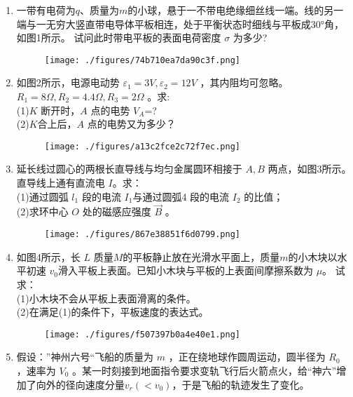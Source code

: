 
\begin{enumerate}
\item 一带有电荷为$q$、质量为$m$的小球，悬于一不带电绝缘细丝线一端。线的另一端与一无穷大竖直带电导体平板相连，处于平衡状态时细线与平板成$30$°角，如图1所示。 试问此时带电平板的表面电荷密度 $\sigma$ 为多少?
\begin{figure}[ht]
\centering
\texttt{[image: ./figures/74b710ea7da90c3f.png]}
\caption{} \label{fig_ZKYP06_1}
\end{figure}
\item 如图2所示，电源电动势  $\varepsilon_1=3V,\varepsilon_2=12V$ ，其内阻均可忽略。 $R_1=8\Omega,R_2=4.4\Omega,R_3=2\Omega$  。求:\\
(1)$K$ 断开时，$A$  点的电势  $V_A$=?\\
(2)$K$合上后，$A$  点的电势又为多少？
\begin{figure}[ht]
\centering
\texttt{[image: ./figures/a13c2fce2c72f7ec.png]}
\caption{} \label{fig_ZKYP06_2}
\end{figure}
\item 延长线过圆心的两根长直导线与均匀金属圆环相接于 $A,B $ 两点，如图3所示。直导线上通有直流电 $I$。求：\\
(1)通过圆弧 $l_1$ 段的电流 $I_1 $与通过圆弧4 段的电流 $I_2$ 的比值；\\
(2)求环中心 $O$ 处的磁感应强度 $\vec B$ 。
\begin{figure}[ht]
\centering
\texttt{[image: ./figures/867e38851f6d0799.png]}
\caption{} \label{fig_ZKYP06_3}
\end{figure}
\item 如图4所示，长 $L$ 质量$M$的平板静止放在光滑水平面上，质量$m$的小木块以水平初速 $v_0$滑入平板上表面。已知小木块与平板的上表面间摩擦系数为 $\mu $。 试求：\\
(1)小木块不会从平板上表面滑离的条件。\\
(2)在满足(1)的条件下，平板速度的表达式。
\begin{figure}[ht]
\centering
\texttt{[image: ./figures/f507397b0a4e40e1.png]}
\caption{} \label{fig_ZKYP06_4}
\end{figure}
\item 假设：”神州六号“飞船的质量为 $m$ ，正在绕地球作圆周运动，圆半径为 $R_0$ ，速率为 $V_0$ 。某一时刻接到地面指令要求变轨飞行后火箭点火，给“神六”增加了向外的径向速度分量$v_r(<v_0)$，于是飞船的轨迹发生了变化。\\

\end{enumerate}
